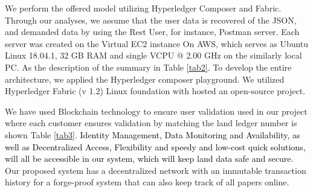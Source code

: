 \documentclass[12pt]{ucthesis}
\begin{document}
We perform the offered model utilizing  Hyperledger Composer and Fabric. Through our analyses, we assume that the user data is recovered of the JSON, and demanded data by using the Rest User, for instance, Postman server. Each server was created on the Virtual EC2 instance On AWS, which serves as Ubuntu Linux 18.04.1, 32 GB RAM and single VCPU @ 2.00 GHz on the similarly local PC. As the description of the summary in Table \ref{tab2}. To develop the entire architecture, we applied the Hyperledger composer playground. We utilized Hyperledger Fabric (v 1.2) Linux foundation with hosted an open-source project.


\begin{table}[t!]
\centering

\caption{Comparison of Existing Works with Proposed Work}
\label{tab3}

\vspace{2mm}
\end{table}
We have used Blockchain technology to ensure user validation used in our project where each customer ensures validation by matching the land ledger number is shown Table \ref{tab3}. \textcolor{black}{ Identity Management, Data Monitoring and Availability, as well as Decentralized Access, Flexibility and speedy and low-cost quick solutions, will all be accessible in our system, which will keep land data safe and secure.} Our proposed system has a decentralized network with an immutable transaction history for a forge-proof system that can also keep track of all papers online.
\end{document}
